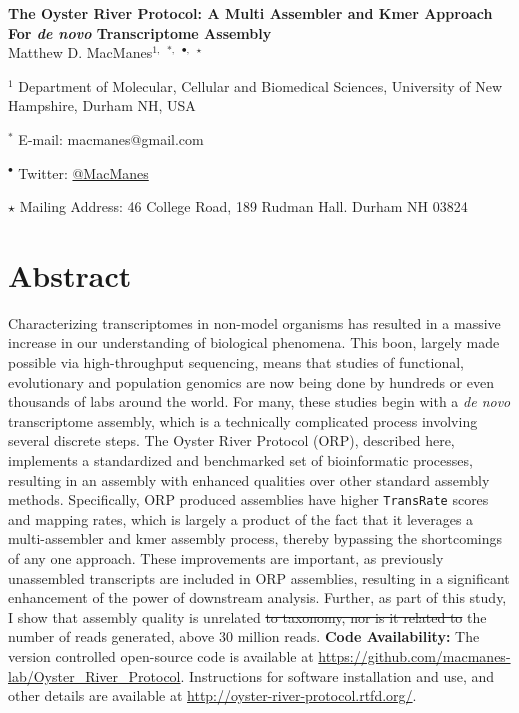 \documentclass[10pt,letterpaper]{article}
\date{}
\providecommand{\DIFaddtex}[1]{{\protect\color{blue}\uwave{#1}}} %
\providecommand{\DIFdeltex}[1]{{\protect\color{red}\sout{#1}}}                      %
\providecommand{\DIFaddbegin}{} %
\providecommand{\DIFaddend}{} %
\providecommand{\DIFdelbegin}{} %
\providecommand{\DIFdelend}{} %
\providecommand{\DIFadd}[1]{\texorpdfstring{\DIFaddtex{#1}}{#1}} %
\providecommand{\DIFdel}[1]{\texorpdfstring{\DIFdeltex{#1}}{}} %
\newcommand{\DIFscaledelfig}{0.5}
\newlength{\DIFdelgraphicswidth} %
\newlength{\DIFdelgraphicsheight} %
\newcommand{\DIFaddincludegraphics}[2][]{{\color{blue}\fbox{\DIFOincludegraphics[#1]{#2}}}} %
\newcommand{\DIFdelincludegraphics}[2][]{%
\sbox{\DIFdelgraphicsbox}{\DIFOincludegraphics[#1]{#2}}%
\settoboxwidth{\DIFdelgraphicswidth}{\DIFdelgraphicsbox} %
\settoboxtotalheight{\DIFdelgraphicsheight}{\DIFdelgraphicsbox} %
\scalebox{\DIFscaledelfig}{%
\parbox[b]{\DIFdelgraphicswidth}{\usebox{\DIFdelgraphicsbox}\\[-\baselineskip] \rule{\DIFdelgraphicswidth}{0em}}\llap{\resizebox{\DIFdelgraphicswidth}{\DIFdelgraphicsheight}{%
\setlength{\unitlength}{\DIFdelgraphicswidth}%
\begin{picture}(1,1)%
\thicklines\linethickness{2pt} %
{\color[rgb]{1,0,0}\put(0,0){\framebox(1,1){}}}%
{\color[rgb]{1,0,0}\put(0,0){\line( 1,1){1}}}%
{\color[rgb]{1,0,0}\put(0,1){\line(1,-1){1}}}%
\end{picture}%
}\hspace*{3pt}}} %
} %
\DeclareRobustCommand{\DIFaddbegin}{\DIFOaddbegin \let\includegraphics\DIFaddincludegraphics} %
\DeclareRobustCommand{\DIFaddend}{\DIFOaddend \let\includegraphics\DIFOincludegraphics} %
\DeclareRobustCommand{\DIFdelbegin}{\DIFOdelbegin \let\includegraphics\DIFdelincludegraphics} %
\DeclareRobustCommand{\DIFdelend}{\DIFOaddend \let\includegraphics\DIFOincludegraphics} %
\begin{document}
\vspace*{0.35in}


\begin{flushleft}

{\Large
\textbf{The Oyster River Protocol: A Multi Assembler and Kmer Approach For \textit{de novo} Transcriptome Assembly }}
\\
Matthew D. MacManes$^{1,}$ $^{\ast,}$ $^{\bullet,}$ $^\star$

$^{1}$ Department of Molecular, Cellular and Biomedical Sciences, University of New Hampshire, Durham NH, USA

$^\ast$ E-mail: macmanes@gmail.com

$^\bullet$ Twitter: \href{http://twitter.com/macmanes}{@MacManes}

$\star$ Mailing Address: 46 College Road, 189 Rudman Hall. Durham NH 03824
\end{flushleft}


\newpage

\linenumbers

\section*{Abstract}

Characterizing transcriptomes in non-model organisms has resulted in a massive increase in our understanding of biological phenomena. This boon, largely made possible via high-throughput sequencing, means that studies of functional, evolutionary and population genomics are now being done by hundreds or even thousands of labs around the world. For many, these studies begin with a \textit{de novo} transcriptome assembly, which is a technically complicated process involving several discrete steps. The Oyster River Protocol (ORP), described here, implements a standardized and benchmarked set of bioinformatic processes, resulting in an assembly with enhanced qualities over other standard assembly methods. Specifically, ORP produced assemblies have higher \DIFaddbegin \texttt{\DIFadd{Detonate}} \DIFadd{and }\DIFaddend \texttt{TransRate} scores and mapping rates, which is largely a product of the fact that it leverages a multi-assembler and kmer assembly process, thereby bypassing the shortcomings of any one approach. These improvements are important, as previously unassembled transcripts are included in ORP assemblies, resulting in a significant enhancement of the power of downstream analysis. Further, as part of this study, I show that assembly quality is unrelated \DIFdelbegin \DIFdel{to taxonomy, nor is it related to }\DIFdelend \DIFaddbegin \DIFadd{with }\DIFaddend the number of reads generated, above 30 million reads.  \textbf{Code Availability:} The version controlled open-source code is available at \url{https://github.com/macmanes-lab/Oyster_River_Protocol}.  Instructions for software installation and use, and other details are available at \url{http://oyster-river-protocol.rtfd.org/}.
\end{document}
